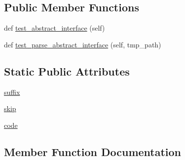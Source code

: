 \subsection*{Public Member Functions}
\begin{DoxyCompactItemize}
\item 
def \hyperlink{classnumpy_1_1f2py_1_1tests_1_1test__abstract__interface_1_1TestAbstractInterface_a4383c265e3b18e6dd8bb412057c5c5a8}{test\+\_\+abstract\+\_\+interface} (self)
\item 
def \hyperlink{classnumpy_1_1f2py_1_1tests_1_1test__abstract__interface_1_1TestAbstractInterface_a8faf5f8e02405a3ff123ad257b3ac470}{test\+\_\+parse\+\_\+abstract\+\_\+interface} (self, tmp\+\_\+path)
\end{DoxyCompactItemize}
\subsection*{Static Public Attributes}
\begin{DoxyCompactItemize}
\item 
\hyperlink{classnumpy_1_1f2py_1_1tests_1_1test__abstract__interface_1_1TestAbstractInterface_ae1d0237a90061249ef0d00eb962a1307}{suffix}
\item 
\hyperlink{classnumpy_1_1f2py_1_1tests_1_1test__abstract__interface_1_1TestAbstractInterface_a86dcaaf7b705695203f8b508c5fe6066}{skip}
\item 
\hyperlink{classnumpy_1_1f2py_1_1tests_1_1test__abstract__interface_1_1TestAbstractInterface_a7668d85edc8a8ba55d88c7b34ad3b4ef}{code}
\end{DoxyCompactItemize}


\subsection{Member Function Documentation}
\mbox{\label{classnumpy_1_1f2py_1_1tests_1_1test__abstract__interface_1_1TestAbstractInterface_a4383c265e3b18e6dd8bb412057c5c5a8}} 
